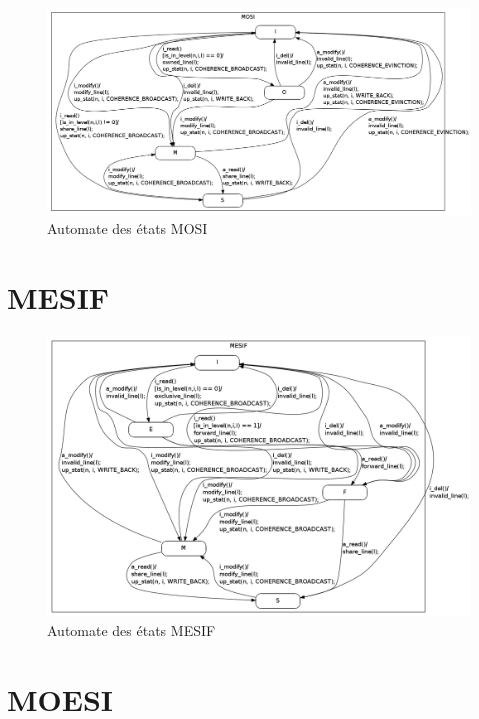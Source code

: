 \begin{figure}[!h]
\begin{center}
   \includegraphics[scale=0.3]{images/MOSI.png}
   \caption{\label{img:state_mosi} Automate des états MOSI}
\end{center}
\end{figure}

\section{MESIF}

\begin{figure}[!h]
\begin{center}
   \includegraphics[scale=0.3]{images/MESIF.png}
   \caption{\label{img:state_mesif} Automate des états MESIF}
\end{center}
\end{figure}

\section{MOESI}


